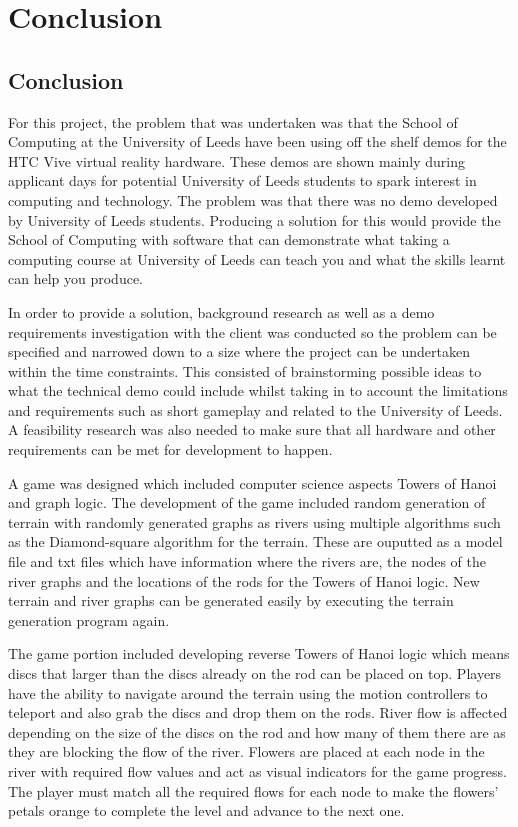 \chapter{Conclusion}
\label{chapter8}

\section{Conclusion}
For this project, the problem that was undertaken was that the School of Computing at the University of Leeds have been using off the shelf demos for the HTC Vive virtual reality hardware. These demos are shown mainly during applicant days for potential University of Leeds students to spark interest in computing and technology. The problem was that there was no demo developed by University of Leeds students. Producing a solution for this would provide the School of Computing with software that can demonstrate what taking a computing course at University of Leeds can teach you and what the skills learnt can help you produce.
\newline
\par
In order to provide a solution, background research as well as a demo requirements investigation with the client was conducted so the problem can be specified and narrowed down to a size where the project can be undertaken within the time constraints. This consisted of brainstorming possible ideas to what the technical demo could include whilst taking in to account the limitations and requirements such as short gameplay and related to the University of Leeds. A feasibility research was also needed to make sure that all hardware and other requirements can be met for development to happen.
\newline
\par
A game was designed which included computer science aspects Towers of Hanoi and graph logic. The development of the game included random generation of terrain with randomly generated graphs as rivers using multiple algorithms such as the Diamond-square algorithm for the terrain. These are ouputted as a model file and txt files which have information where the rivers are, the nodes of the river graphs and the locations of the rods for the Towers of Hanoi logic. New terrain and river graphs can be generated easily by executing the terrain generation program again.
\newline
\par
The game portion included developing reverse Towers of Hanoi logic which means discs that larger than the discs already on the rod can be placed on top. Players have the ability to navigate around the terrain using the motion controllers to teleport and also grab the discs and drop them on the rods. River flow is affected depending on the size of the discs on the rod and how many of them there are as they are blocking the flow of the river. Flowers are placed at each node in the river with required flow values and act as visual indicators for the game progress. The player must match all the required flows for each node to make the flowers' petals orange to complete the level and advance to the next one.
